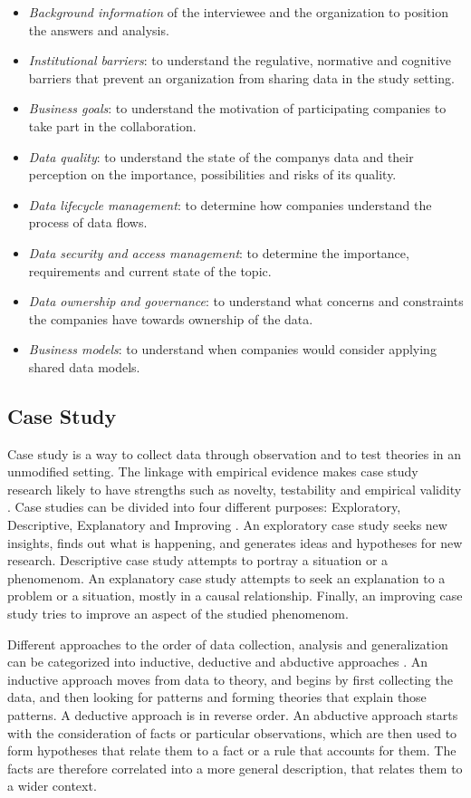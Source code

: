 \begin{itemize}  
\item \textit{Background information} of the interviewee and the organization to position the answers and analysis.
\item \textit{Institutional barriers}: to understand the regulative, normative and cognitive barriers that prevent an organization from sharing data in the study setting.
\item \textit{Business goals}: to understand the motivation of participating companies to take part in the collaboration. 
\item \textit{Data quality}: to understand the state of the companys data and their perception on the importance, possibilities and risks of its quality. 
\item \textit{Data lifecycle management}: to determine how companies understand the process of data flows.
\item \textit{Data security and access management}: to determine the importance, requirements and current state of the topic. 
\item \textit{Data ownership and governance}: to understand what concerns and constraints the companies have towards ownership of the data.
\item \textit{Business models}: to understand when companies would consider applying shared data models.

\end{itemize}

\subsection{Case Study}
Case study is a way to collect data through observation and to test theories in an unmodified setting. The linkage with empirical evidence makes case study research likely to have strengths such as novelty, testability and empirical validity \cite{eisenhardt1989building}. Case studies can be divided into four different purposes: Exploratory, Descriptive, Explanatory and Improving \cite{robson2016real}. An exploratory case study seeks new insights, finds out what is happening, and generates ideas and hypotheses for new research. Descriptive case study attempts to portray a situation or a phenomenom. An explanatory case study attempts to seek an explanation to a problem or a situation, mostly in a causal relationship. Finally, an improving case study tries to improve an aspect of the studied phenomenom.

Different approaches to the order of data collection, analysis and generalization can be categorized into inductive, deductive and abductive approaches \cite{dubois2002systematic}. An inductive approach moves from data to theory, and begins by first collecting the data, and then looking for patterns and forming theories that explain those patterns. A deductive approach is in reverse order. An abductive approach starts with the consideration of facts or particular observations, which are then used to form hypotheses that relate them to a fact or a rule that accounts for them. The facts are therefore correlated into a more general description, that relates them to a wider context.

